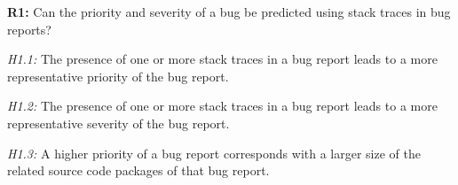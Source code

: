 \newcommand{\questiona}{\begin{minipage}[t]{4.5 in}\textbf{R1:} Can the priority and severity of a bug be predicted using stack traces in bug reports? \end{minipage}} 

\newcommand{\hypaa}{\begin{minipage}[t]{4.5 in}\emph{H1.1:} The presence of one or more stack traces in a bug report leads to a more representative priority of the bug report. \end{minipage}} 

\newcommand{\hypab}{\begin{minipage}[t]{4.5 in}\emph{H1.2:} The presence of one or more stack traces in a bug report leads to a more representative severity of the bug report. \end{minipage}} 

\newcommand{\hypac}{\begin{minipage}[t]{4.5 in}\emph{H1.3:} A higher priority of a bug report corresponds with a larger size of the related source code packages of that bug report. \end{minipage}} 

\newcommand{\hypad}{\begin{minipage}[t]{4.5 in}\emph{H1.4:} A higher severity of a bug report corresponds with a larger size of the related source code packages of that bug report. \end{minipage}} 

\newcommand{\hypae}{\begin{minipage}[t]{4.5 in}\emph{H1.5:} A higher priority of a bug report corresponds with a larger size of the related source code classes of that bug report. \end{minipage}} 

\newcommand{\hypaf}{\begin{minipage}[t]{4.5 in}\emph{H1.6:} A higher severity of a bug report corresponds with a larger size of the related source code classes of that bug report. \end{minipage}} 

\vspace{\baselineskip}
\questiona{}

\vspace{\baselineskip}
\hypaa{}

\vspace{\baselineskip}
\hypab{}

\vspace{\baselineskip}
\hypac{}

